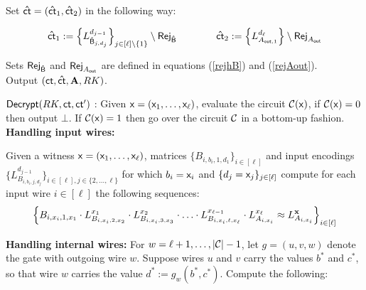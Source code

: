 


\EI 
Set ${\mathsf{\hat{ct}}}= ({\mathsf{\hat{ct}}}_1,{\mathsf{\hat{ct}}}_2)$ in the following way: 
         
          \begin{equation*}
{\mathsf{\hat{ct}}}_1:=\Big\{ L_{\mathsf{\hat{B}}_{j,d_j}}^{d_{j-1}}\Big\}_{j\in[\ell]\setminus{\{1\}}}\setminus {\ensuremath{\mathsf{Rej}}_{\mathsf{\hat{B}}}}~~~~~~~~~~~~
{\mathsf{\hat{ct}}}_2:=\Big\{L_{A_{\mathsf{out},1}}^{d_{\ell}} \Big\}\setminus {\ensuremath{\mathsf{Rej}}_{A_\ensuremath\mathsf{out}}}
         \end{equation*}

Sets $\mathsf{Rej}_{\mathsf{\hat{B}}}$ and $\mathsf{Rej}_{A_\mathsf{out}}$ are defined in equations (\ref{rejhB}) and (\ref{rejAout}). \\
Output $({\mathsf{ct}}, {\mathsf{\hat{ct}}}, {\bf A},RK)$.





\item $\mathsf{Decrypt}(RK, {\mathsf{ct}},{\mathsf{ct}}')$ : Given $\mathsf{x}=(\mathsf{x}_1,\ldots,\mathsf{x}_\ell)$, evaluate the circuit ${\cal C}(\mathsf{x})$, if ${\cal C}(\mathsf{x})= 0$ then output $\bot$. If ${\cal C}(\mathsf{x})= 1$ then go over the circuit ${\cal C}$ in a bottom-up fashion. \\
{\bf Handling input wires:}



Given a witness $\mathsf{x}=(\mathsf{x}_1,\ldots,\mathsf{x}_\ell)$, matrices $\{B_{i,b_i,1,d_1}\}_{i\in[\ell]}$ and input encodings $\{L_{B_{i,b_i,j,d_j}}^{d_{j-1}}\}_{i\in[\ell],j\in\{2,\ldots,\ell\}}$ for which $b_i=\mathsf{x}_i$ and $\{d_j=\mathsf{x}_j\}_{j\in[\ell]}$ compute for each input wire $i\in[\ell]$ the following sequences:  
\begin{equation}\label{mult}
\Big\{B_{i,x_i,1,x_1}\cdot L_{B_{i,x_i,2,x_2}}^{x_{1}}\cdot L_{B_{i,x_i,3,x_3}}^{x_{2}}\cdot\ldots\cdot L_{B_{i,x_i,\ell,x_\ell}}^{x_{\ell-1}}\cdot L_{A_{i,x_i}}^{x_{\ell}}\approx L_{A_{i,x_i}}^{\mathsf{{\bf x}}}\Big\}_{i\in[\ell]}
   \end{equation}





{\bf Handling internal wires:}
 For $w = \ell+1,\ldots,|{\cal C}|-1$, let
$g = (u, v,w)$ denote the gate with outgoing wire $w$. Suppose wires $u$ and $v$ carry the values $b^*$
and $c^*$, so that wire $w$ carries the value $d^* := g_w(b^*,c^*)$. Compute the following: 

